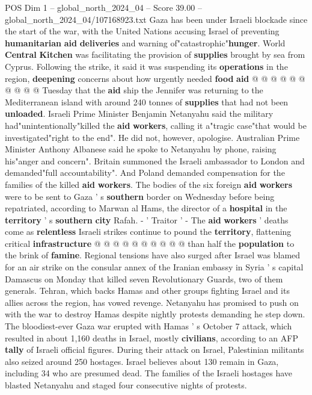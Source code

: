 \begin{textsample}{POS Dim 1 – global\_north\_2024\_04 – Score 39.00 – global\_north\_2024\_04/107168923.txt}
Gaza has been under Israeli blockade since the start of the war, with the United Nations accusing Israel of preventing \textbf{humanitarian} \textbf{aid} \textbf{deliveries} and warning of"catastrophic"\textbf{hunger}.
World \textbf{Central} \textbf{Kitchen} was facilitating the provision of \textbf{supplies} brought by sea from Cyprus.
Following the strike, it said it was suspending its \textbf{operations} in the region, \textbf{deepening} concerns about how urgently needed \textbf{food} \textbf{aid} @ @ @ @ @ @ @ @ @ @ Tuesday that the \textbf{aid} ship the Jennifer was returning to the Mediterranean island with around 240 tonnes of \textbf{supplies} that had not been \textbf{unloaded}.
Israeli Prime Minister Benjamin Netanyahu said the military had"unintentionally"killed the \textbf{aid} \textbf{workers}, calling it a"tragic case"that would be investigated"right to the end".
He did not, however, apologise.
Australian Prime Minister Anthony Albanese said he spoke to Netanyahu by phone, raising his"anger and concern".
Britain summoned the Israeli ambassador to London and demanded"full accountability".
And Poland demanded compensation for the families of the killed \textbf{aid} \textbf{workers}.
The bodies of the six foreign \textbf{aid} \textbf{workers} were to be sent to Gaza ' s \textbf{southern} border on Wednesday before being repatriated, according to Marwan al Hams, the director of a \textbf{hospital} in the \textbf{territory} ' s \textbf{southern} \textbf{city} Rafah. - ' Traitor ' - The \textbf{aid} \textbf{workers} ' deaths come as \textbf{relentless} Israeli strikes continue to pound the \textbf{territory}, flattening critical \textbf{infrastructure} @ @ @ @ @ @ @ @ @ @ than half the \textbf{population} to the brink of \textbf{famine}.
Regional tensions have also surged after Israel was blamed for an air strike on the consular annex of the Iranian embassy in Syria ' s capital Damascus on Monday that killed seven Revolutionary Guards, two of them generals.
Tehran, which backs Hamas and other groups fighting Israel and its allies across the region, has vowed revenge.
Netanyahu has promised to push on with the war to destroy Hamas despite nightly protests demanding he step down.
The bloodiest-ever Gaza war erupted with Hamas ' s October 7 attack, which resulted in about 1,160 deaths in Israel, mostly \textbf{civilians}, according to an AFP \textbf{tally} of Israeli official figures.
During their attack on Israel, Palestinian militants also seized around 250 hostages.
Israel believes about 130 remain in Gaza, including 34 who are presumed dead.
The families of the Israeli hostages have blasted Netanyahu and staged four consecutive nights of protests.

\end{textsample}
